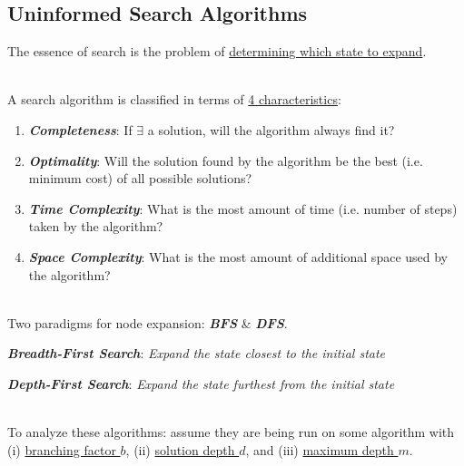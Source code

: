 \documentclass[12pt]{extarticle}
\theoremstyle{definition}
\theoremstyle{remark}
\newcommand{\pstart}[0]{\noindent}
\newcommand{\term}[1]{\noindent\textbf{\textit{#1}}}
\begin{document}
\subsection{Uninformed Search Algorithms}

\pstart
The essence of search is the problem of \ul{determining which state to expand}.

~\\ \pstart
A search algorithm is classified in terms of \ul{4 characteristics}: \begin{enumerate}
    \item \term{Completeness}: If $\exists$ a solution, will the algorithm always find it?
    \item \term{Optimality}: Will the solution found by the algorithm be the best (i.e. minimum cost) of all possible solutions?
    \item\term{Time Complexity}: What is the most amount of time (i.e. number of steps) taken by the algorithm?
    \item\term{Space Complexity}: What is the most amount of additional space used by the algorithm?
\end{enumerate}

~\\ \pstart
Two paradigms for node expansion: \term{BFS} \& \term{DFS}.
\begin{center}
    \term{Breadth-First Search}: \textit{Expand the state closest to the initial state}
    
    \term{Depth-First Search}: \textit{Expand the state furthest from the initial state}
\end{center}

~\\ \pstart
To analyze these algorithms: assume they are being run on some algorithm with (i) \ul{branching factor $b$}, (ii) \ul{solution depth $d$}, and (iii) \ul{maximum depth $m$}.
\end{document}
